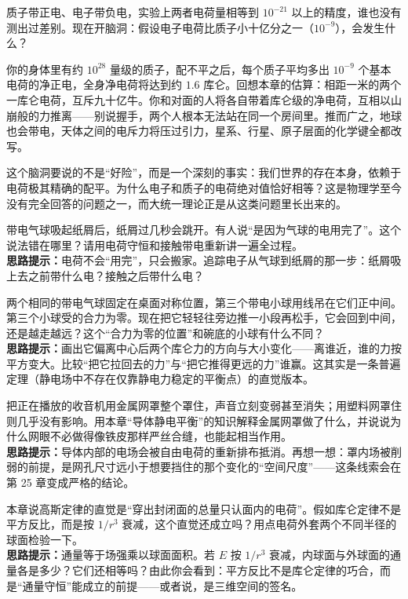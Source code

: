 
\begin{thought}[如果质子和电子的电荷差一点点]
质子带正电、电子带负电，实验上两者电荷量相等到 \(10^{-21}\) 以上的精度，谁也没有测出过差别。现在开脑洞：假设电子电荷比质子小十亿分之一（\(10^{-9}\)），会发生什么？

你的身体里有约 \(10^{28}\) 量级的质子，配不平之后，每个质子平均多出 \(10^{-9}\) 个基本电荷的净正电，全身净电荷将达到约 \(1.6\) 库仑。回想本章的估算：相距一米的两个一库仑电荷，互斥九十亿牛。你和对面的人将各自带着库仑级的净电荷，互相以山崩般的力推离——别说握手，两个人根本无法站在同一个房间里。推而广之，地球也会带电，天体之间的电斥力将压过引力，星系、行星、原子层面的化学键全都改写。

这个脑洞要说的不是“好险”，而是一个深刻的事实：我们世界的存在本身，依赖于电荷极其精确的配平。为什么电子和质子的电荷绝对值恰好相等？这是物理学至今没有完全回答的问题之一，而大统一理论正是从这类问题里长出来的。
\end{thought}

\begin{puzzles}
  \item 带电气球吸起纸屑后，纸屑过几秒会跳开。有人说“是因为气球的电用完了”。这个说法错在哪里？请用电荷守恒和接触带电重新讲一遍全过程。\\
  \textbf{思路提示：}电荷不会“用完”，只会搬家。追踪电子从气球到纸屑的那一步：纸屑吸上去之前带什么电？接触之后带什么电？
  \item 两个相同的带电气球固定在桌面对称位置，第三个带电小球用线吊在它们正中间。第三个小球受的合力为零。现在把它轻轻往旁边推一小段再松手，它会回到中间，还是越走越远？这个“合力为零的位置”和碗底的小球有什么不同？\\
  \textbf{思路提示：}画出它偏离中心后两个库仑力的方向与大小变化——离谁近，谁的力按平方变大。比较“把它拉回去的力”与“把它推得更远的力”谁赢。这其实是一条普遍定理（静电场中不存在仅靠静电力稳定的平衡点）的直觉版本。
  \item 把正在播放的收音机用金属网罩整个罩住，声音立刻变弱甚至消失；用塑料网罩住则几乎没有影响。用本章“导体静电平衡”的知识解释金属网罩做了什么，并说说为什么网眼不必做得像铁皮那样严丝合缝，也能起相当作用。\\
  \textbf{思路提示：}导体内部的电场会被自由电荷的重新排布抵消。再想一想：罩内场被削弱的前提，是网孔尺寸远小于想要挡住的那个变化的“空间尺度”——这条线索会在第 25 章变成严格的结论。
  \item 本章说高斯定律的直觉是“穿出封闭面的总量只认面内的电荷”。假如库仑定律不是平方反比，而是按 \(1/r^3\) 衰减，这个直觉还成立吗？用点电荷外套两个不同半径的球面检验一下。\\
  \textbf{思路提示：}通量等于场强乘以球面面积。若 \(E\) 按 \(1/r^3\) 衰减，内球面与外球面的通量各是多少？它们还相等吗？由此你会看到：平方反比不是库仑定律的巧合，而是“通量守恒”能成立的前提——或者说，是三维空间的签名。
\end{puzzles}
